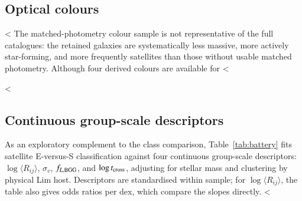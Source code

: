 \documentclass{aa}
\newcommand{\CC}{Control\textsubscript{4C}}
\newcommand{\CG}{CG\textsubscript{4}}
\newcommand{\Rmed}{\langle R_{ij}\rangle}
\begin{document}
\begin{appendix}
\subsection{Optical colours}\label{sec:optical_colours}
<%
The matched-photometry colour sample is not representative of the full catalogues: the retained galaxies are systematically less massive, more actively star-forming, and more frequently satellites than those without usable matched photometry. Although four derived colours are available for <%
\fi

<%
\subsection{Continuous group-scale descriptors}\label{app:battery}

As an exploratory complement to the class comparison, Table~\ref{tab:battery} fits satellite E-versus-S classification against four continuous group-scale descriptors: \(\log\Rmed\), \(\sigma_v\), \(f_{L,\rm BGG}\), and \(\log t_{\rm cross}\), adjusting for stellar mass and clustering by physical Lim host. Descriptors are standardised within sample; for \(\log\Rmed\), the table also gives odds ratios per dex, which compare the slopes directly. <%



\end{appendix}
\end{document}
